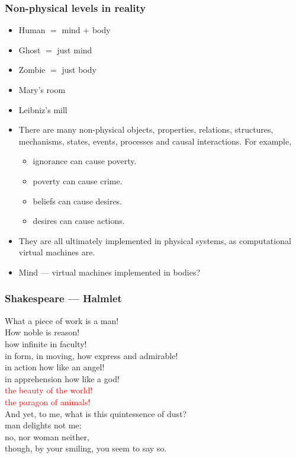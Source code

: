 \documentclass[UTF8,11pt,colorlinks,compress,openany]{beamer}%
\begin{document}
\begin{frame}\frametitle{Non-physical levels in reality}
\begin{itemize}
	\item Human $=$ mind $+$ body
	\item Ghost $=$ just mind
	\item Zombie $=$ just body
	\item Mary's room
	\item Leibniz's mill
\end{itemize}
\begin{itemize}
	\item There are many non-physical objects, properties, relations, structures, mechanisms, states, events, processes and causal interactions. For example,
	\begin{itemize}
		\item ignorance can cause poverty.
		\item poverty can cause crime.
		\item beliefs can cause desires.
		\item desires can cause actions.
	\end{itemize}
	\item They are all ultimately implemented in physical systems, as computational virtual machines are.
	\item Mind --- virtual machines implemented in bodies?
\end{itemize}
\end{frame}

\begin{frame}\frametitle{}
\begin{figure}[htb]
\hspace*{2ex}
\end{figure}
\end{frame}

\begin{frame}\frametitle{Shakespeare --- Halmlet}
{\Large
What a piece of work is a man!\\
How noble is reason!\\
how infinite in faculty!\\
in form, in moving, how express and admirable!\\
in action how like an angel!\\
in apprehension how like a god!\\
\textcolor{red}{the beauty of the world!}\\
\textcolor{red}{the paragon of animals!}\\
And yet, to me, what is this quintessence of dust?\\
man delights not me;\\
no, nor woman neither,\\
though, by your smiling, you seem to say so.}
\end{frame}
\end{document}

